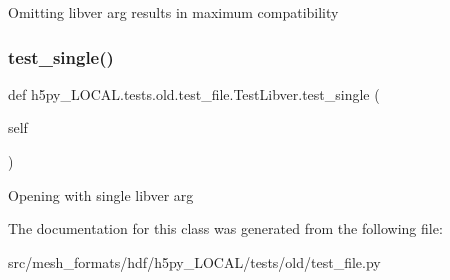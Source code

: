 \begin{DoxyVerb}Omitting libver arg results in maximum compatibility \end{DoxyVerb}
 \mbox{\label{classh5py__LOCAL_1_1tests_1_1old_1_1test__file_1_1TestLibver_abc81c59b2f952d18a69e12c912aac474}} 
\subsubsection{\texorpdfstring{test\+\_\+single()}{test\_single()}}
{\footnotesize\ttfamily def h5py\+\_\+\+L\+O\+C\+A\+L.\+tests.\+old.\+test\+\_\+file.\+Test\+Libver.\+test\+\_\+single (\begin{DoxyParamCaption}\item[{}]{self }\end{DoxyParamCaption})}

\begin{DoxyVerb}Opening with single libver arg \end{DoxyVerb}
 

The documentation for this class was generated from the following file\+:\begin{DoxyCompactItemize}
\item 
src/mesh\+\_\+formats/hdf/h5py\+\_\+\+L\+O\+C\+A\+L/tests/old/test\+\_\+file.\+py\end{DoxyCompactItemize}
